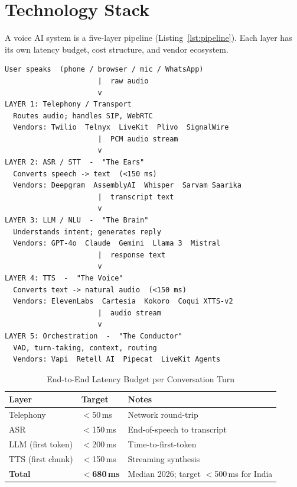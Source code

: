 \documentclass[12pt,a4paper]{article}
\begin{document}
\section{Technology Stack}
\label{sec:stack}

A voice AI system is a five-layer pipeline (Listing~\ref{lst:pipeline}).
Each layer has its own latency budget, cost structure, and vendor ecosystem.

\begin{lstlisting}[caption={Five-Layer Voice AI Pipeline},label=lst:pipeline,
                   basicstyle=\ttfamily\scriptsize]
User speaks  (phone / browser / mic / WhatsApp)
                      |  raw audio
                      v
LAYER 1: Telephony / Transport
  Routes audio; handles SIP, WebRTC
  Vendors: Twilio  Telnyx  LiveKit  Plivo  SignalWire
                      |  PCM audio stream
                      v
LAYER 2: ASR / STT  -  "The Ears"
  Converts speech -> text  (<150 ms)
  Vendors: Deepgram  AssemblyAI  Whisper  Sarvam Saarika
                      |  transcript text
                      v
LAYER 3: LLM / NLU  -  "The Brain"
  Understands intent; generates reply
  Vendors: GPT-4o  Claude  Gemini  Llama 3  Mistral
                      |  response text
                      v
LAYER 4: TTS  -  "The Voice"
  Converts text -> natural audio  (<150 ms)
  Vendors: ElevenLabs  Cartesia  Kokoro  Coqui XTTS-v2
                      |  audio stream
                      v
LAYER 5: Orchestration  -  "The Conductor"
  VAD, turn-taking, context, routing
  Vendors: Vapi  Retell AI  Pipecat  LiveKit Agents
\end{lstlisting}

\begin{table}[H]\centering
\caption{End-to-End Latency Budget per Conversation Turn}
\label{tab:latency}
\begin{tabularx}{\textwidth}{lll}
\toprule
\textbf{Layer} & \textbf{Target} & \textbf{Notes} \\
\midrule
Telephony             & $<$50\,ms   & Network round-trip \\
ASR                   & $<$150\,ms  & End-of-speech to transcript \\
LLM (first token)     & $<$200\,ms  & Time-to-first-token \\
TTS (first chunk)     & $<$150\,ms  & Streaming synthesis \\
\midrule
\textbf{Total}        & \textbf{$<$680\,ms} & Median 2026; target $<$500\,ms for India \\
\bottomrule
\end{tabularx}
\end{table}
\end{document}
